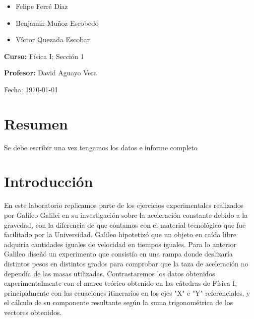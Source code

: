\documentclass[twocolumn,12pt]{article}
\begin{document}
\begin{titlepage}
\begin{flushleft}
			\begin{itemize}
				\item Felipe Ferré Díaz
				\item Benjamin Muñoz Escobedo
                \item Víctor Quezada Escobar
			\end{itemize}
			
			\vspace{0.2in}
			
			\large
			\textbf{Curso:} Física I; Sección 1
			
			\vspace{0.2in}
			
			\large
			\textbf{Profesor:} David Aguayo Vera
		\end{flushleft}
		
		\vspace{0.2in}
		
		\begin{flushright}
			\Large
			Fecha: \today %
		\end{flushright}
		
		
		
		\vspace{1in}
	\end{titlepage}
	
	\section{Resumen}
	Se debe escribir una vez tengamos los datos e informe completo
	
	\section{Introducción}
	En este laboratorio replicamos parte de los ejercicios experimentales realizados por Galileo Galilei en su investigación sobre la aceleración constante debido a la gravedad, con la diferencia de que contamos con el material tecnológico que fue facilitado por la Universidad. Galileo hipotetizó que un objeto en caída libre adquiría cantidades iguales de velocidad en tiempos iguales. Para lo anterior Galileo diseñó un experimento que consistía en una rampa donde deslizaría distintos pesos en distintos grados para comprobar que la taza de aceleración no dependía de las masas utilizadas. Contrastaremos los datos obtenidos experimentalmente con el marco teórico obtenido en las cátedras de Física I, principalmente con las ecuaciones itinerarios en los ejes "X" e "Y" referenciales, y el cálculo de su componente resultante según la suma trigonométrica de los vectores obtenidos.
		
\end{document}
